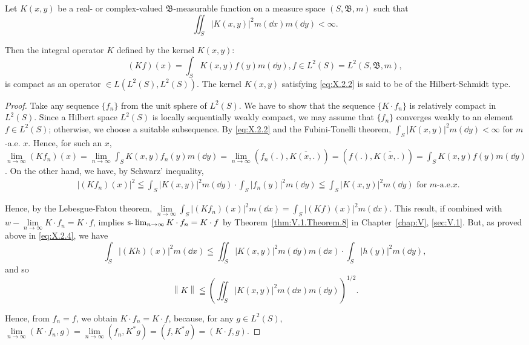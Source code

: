 \begin{example}\label{ex:X.2.Example.2} Let $K(x, y)$ be a real- or complex-valued $\mathfrak{B}$-measurable function on a measure space $(S, \mathfrak{B}, m)$ such that 
\begin{equation}\label{eq:X.2.2}
\iint_{S} \left| K (x, y) \right| ^{2} m (\dd x) m (\dd y) < \infty .
\end{equation}
\end{example}

Then the integral operator $K$ defined by the kernel $K(x, y)$: 
\begin{equation}\label{eq:X.2.3}
(K f) (x) = \int_{S} K (x, y) f (y) m (\dd y), f \in L ^{2} (S) = L ^{2} (S, \mathfrak {B}, m),
\end{equation}
is compact as an operator $\in L(L^2(S), L^2(S))$. The kernel $K(x, y)$ satisfying \eqref{eq:X.2.2} is said to be of the Hilbert-Schmidt type. 

\begin{proof}
 Take any sequence $\{f_n\}$ from the unit sphere of $L^2(S)$. We have to show that the sequence $\{K \cdot f_n\}$ is relatively compact in $L^2(S)$. Since a Hilbert space $L^2(S)$ is locally sequentially weakly compact, we may assume that $\{f_n\}$ converges weakly to an element $f \in L^2(S)$; otherwise, we choose a suitable subsequence. By \eqref{eq:X.2.2} and the Fubini-Tonelli theorem, $\int_{S} |K(x, y)|^2 m(\dd y) < \infty$ for $m$-a.e. $x$. Hence, for such an $x$, $\lim\limits_{n \to \infty} (Kf_n)(x) = \lim\limits_{n \to \infty} \int_{S} K(x, y) f_n(y) m(\dd y) = \lim\limits_{n \to \infty} (f_n(.), \overline{K(x,.)}) = (f(.), \overline{K(x,.)}) = \int_{S} K(x, y) f(y) m(\dd y)$. On the other hand, we have, by Schwarz' inequality, 
\begin{equation}\label{eq:X.2.4}
\begin{aligned}
&\left| (K f _{n}) (x) \right| ^{2} \leqq \int_{S} | K (x, y) | ^{2} m (\dd y) \cdot \int_{S} \left| f _{n} (y) \right| ^{2} m (\dd y) \leqq \int_{S} | K (x, y) | ^{2} m (\dd y) \text{ for } m\text{-a.e.} x.
\end{aligned}
\end{equation}

Hence, by the Lebesgue-Fatou theorem, $\lim\limits_{n\to \infty}\int_S|(Kf_n)(x)|^2 m(\dd x) = \int_S|(Kf)(x)|^2 m(\dd x)$. This result, if combined with $w - \lim\limits_{n\to \infty}K\cdot f_n = K\cdot f$, implies $\text{s-}\lim\nolimits_{n\to \infty}K\cdot f_n = K\cdot f$ by Theorem~\ref{thm:V.1.Theorem.8} in Chapter~\ref{chap:V}, \ref{sec:V.1}. But, as proved above in \eqref{eq:X.2.4}, we have 
\[
\int_{S} | (K h) (x) | ^{2} m (\dd x) \leqq \iint_{S} | K (x, y) | ^{2} m (\dd y) m (\dd x) \cdot \int_{S} | h (y) | ^{2} m (\dd y),
\]
and so 
\begin{equation}\label{eq:X.2.5}
\left\| K \right\| \leqq \left(\iint_{S} \left| K (x, y) \right| ^{2} m (\dd x) m (\dd y)\right) ^{1/2}.
\end{equation}

Hence, from \wlim $f_n = f$, we obtain \wlim $K \cdot f_n = K \cdot f$, because, for any $g \in L^2(S)$, $\lim\limits_{n \to \infty} (K \cdot f_n, g) = \lim\limits_{n \to \infty} (f_n, K^*g) = (f, K^*g) = (K \cdot f, g)$. 
\end{proof}

